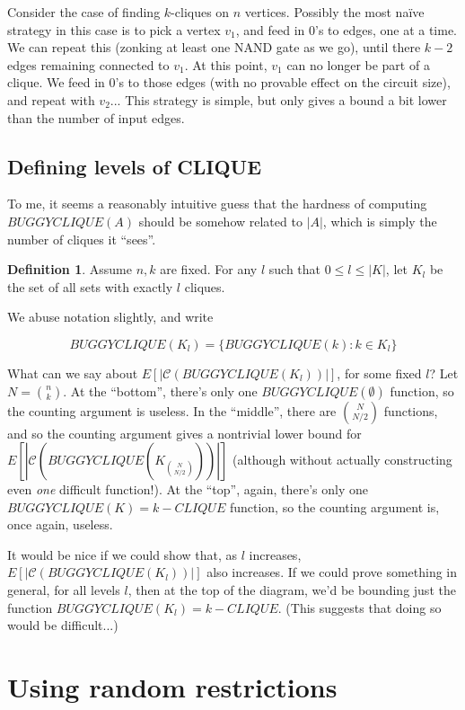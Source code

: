 \documentclass[12pt]{article}
\theoremstyle{definition}
\newtheorem{defn}{Definition}[section]
\newcommand{\bigC}[0]{\mathcal{C}}
\begin{document}
Consider the case of finding $k$-cliques on $n$ vertices.
Possibly the most na\"ive strategy in this case is to pick a vertex $v_1$,
and feed in 0's to edges, one at a time. We can repeat this
(zonking at least one NAND gate as we go), until there
$k-2$ edges remaining connected to $v_1$. At this point, $v_1$ can no
longer be part of a clique. We feed in 0's to those edges (with no
provable effect on the circuit size), and repeat with $v_2$...
This strategy is simple, but only gives a bound a bit lower than
the number of input edges.

\subsection{Defining levels of CLIQUE}

To me, it seems a reasonably intuitive guess that the hardness of
computing $BUGGYCLIQUE(A)$ should be somehow related to
$|A|$, which is simply the number of cliques it ``sees''.

\begin{defn}
\label{CLIQUE-level}
Assume $n, k$ are fixed. For any $l$ such that
$0 \le l \le |K|$, let $K_l$ be the set of all sets
with exactly $l$ cliques. 
\end{defn}

We abuse notation slightly, and write

\[
BUGGYCLIQUE(K_l) = \{ BUGGYCLIQUE(k) : k \in K_l \}
\]

What can we say about $E[|\bigC(BUGGYCLIQUE(K_l))|]$, for
some fixed $l$? Let $N = {n \choose k}$.
At the ``bottom'', there's only one $BUGGYCLIQUE(\emptyset)$
function, so the counting argument is useless.
In the ``middle'',
there are ${N \choose {N/2}}$ functions, and so the counting
argument gives a nontrivial lower bound for
$E[|\bigC(BUGGYCLIQUE(K_{N \choose {N/2}}))|]$ (although
without actually constructing even {\em one} difficult function!).
At the ``top'', again, there's only one $BUGGYCLIQUE(K) = k-CLIQUE$
function, so the counting argument is, once again, useless.

It would be nice if we could show that, as $l$ increases,
$E[|\bigC(BUGGYCLIQUE(K_l))|]$ also increases.
If we could prove something in general, for all levels $l$, then at
the top of the diagram, we'd be bounding just the function
$BUGGYCLIQUE(K_l) = k-CLIQUE$. (This suggests that doing so would
be difficult...)


\section{Using random restrictions}
\end{document}
